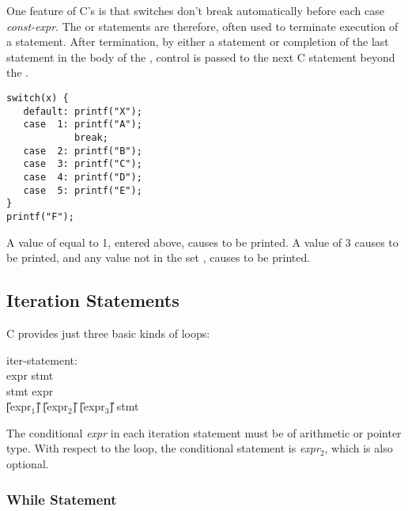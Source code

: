 One feature of C's is that switches don't break automatically before
each case {\it const-expr}.  The  or  statements
are therefore, often used to terminate execution of a 
statement. After termination, by either a  statement or
completion of the last statement in the body of the ,
control is passed to the next C statement beyond the .

\begin{production}
\begin{verbatim}
switch(x) {
   default: printf("X");
   case  1: printf("A"); 
            break; 
   case  2: printf("B");
   case  3: printf("C");
   case  4: printf("D");
   case  5: printf("E");
}
printf("F");            
\end{verbatim}
\end{production}

A value of  equal to 1, entered above, causes  to be
printed. A value of 3 causes  to be printed, and any value not
in the set \T{[1,2,3,4,5]}, causes  to be printed.


\subsection{Iteration Statements}
\label{sec:IterationStatements}

C provides just three basic kinds of loops:

\begin{production}
\bp
{
iter-statement:\\
\>       \T{(} expr \T{)} stmt\\
\>        stmt  \T{(} expr \T{)} \T{;}\\
\>        \T{(} \U{[}expr$_1$\U{]} \T{;} \U{[}expr$_2$\U{]} \T{;} \U{[}expr$_3$\U{]}\T{;}\T{)} stmt
}
\end{production}

The conditional {\it expr} in each iteration statement must be of
arithmetic or pointer type. With respect to the  loop, the
conditional statement is {\it expr$_2$}, which is also optional.

\subsubsection{While Statement}
\label{sec:WhileStatement}


